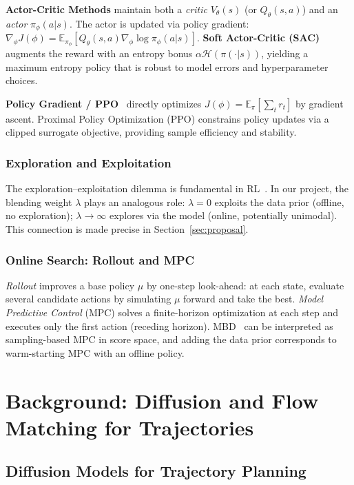 \documentclass[letterpaper, 10pt, conference]{ieeeconf}
\newcommand{\E}{\mathbb{E}}
\begin{document}
\textbf{Actor-Critic Methods} maintain both a \emph{critic} $V_\theta(s)$ (or
$Q_\theta(s,a)$) and an \emph{actor} $\pi_\phi(a|s)$.  The actor is updated
via policy gradient:
$\nabla_\phi J(\phi) = \E_{\pi_\phi}[Q_\theta(s,a)\nabla_\phi\log\pi_\phi(a|s)].$
\textbf{Soft Actor-Critic (SAC)}~\cite{haarnoja2018sac} augments the reward
with an entropy bonus $\alpha\mathcal{H}(\pi(\cdot|s))$, yielding a maximum
entropy policy that is robust to model errors and hyperparameter choices.

\textbf{Policy Gradient / PPO}~\cite{schulman2017ppo} directly optimizes
$J(\phi)=\E_\pi[\sum_t r_t]$ by gradient ascent.  Proximal Policy
Optimization (PPO) constrains policy updates via a clipped surrogate
objective, providing sample efficiency and stability.

\subsubsection{Exploration and Exploitation}
The exploration--exploitation dilemma is fundamental in RL~\cite{suttbarto2018rl}.
In our project, the blending weight $\lambda$ plays an analogous role:
$\lambda=0$ exploits the data prior (offline, no exploration); $\lambda\to\infty$
explores via the model (online, potentially unimodal).  This connection is made
precise in Section~\ref{sec:proposal}.

\subsubsection{Online Search: Rollout and MPC}
\emph{Rollout} improves a base policy $\mu$ by one-step look-ahead: at each
state, evaluate several candidate actions by simulating $\mu$ forward and
take the best.  \emph{Model Predictive Control} (MPC) solves a
finite-horizon optimization at each step and executes only the first action
(receding horizon).  MBD~\cite{mbd} can be interpreted as
sampling-based MPC in score space, and adding the data prior corresponds to
warm-starting MPC with an offline policy.

\section{Background: Diffusion and Flow Matching for Trajectories}
\label{sec:diffusion_background}

\subsection{Diffusion Models for Trajectory Planning}
\end{document}
